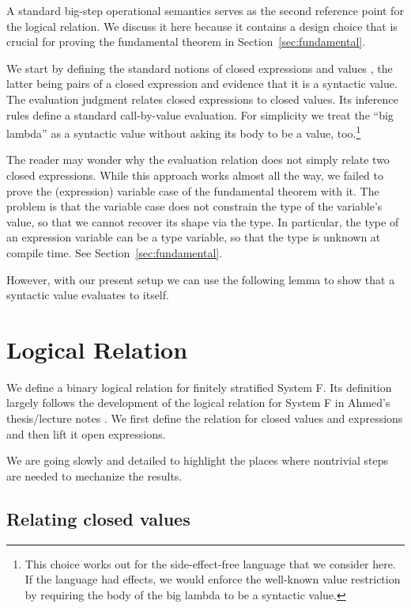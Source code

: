 \documentclass[acmsmall,anonymous,review,screen]{acmart}
\begin{document}
A standard big-step operational semantics serves as the second
reference point for the logical relation. We discuss it here because
it contains a design choice that is crucial for proving the
fundamental theorem in Section~\ref{sec:fundamental}.

We start by defining the
standard notions of closed expressions {\ACExpr} and values {\AValue}, the latter being
pairs of a closed expression and evidence {\AisValue} that it is a syntactic value.
\BigStepCExpr
\BigStepisValue
\BigStepValue
The evaluation judgment relates closed expressions to closed values.
Its inference rules define a standard call-by-value evaluation.
For simplicity we treat the ``big lambda'' as a syntactic value
without asking its body to be a value, too.\footnote{This choice works out for the
  side-effect-free language that we consider here. If the language had
  effects, we would enforce the well-known value restriction by
  requiring the body of the big lambda to be a syntactic value.}
\BigStepSemantics

The reader may wonder why the evaluation relation does not simply relate two closed
expressions. While this approach works almost all the way, we
failed to prove the (expression) variable case of the fundamental theorem with
it. The problem is that the variable case does not constrain the type
of the variable's value, so that we cannot recover its shape via
the {\AisValue} type. In particular, the type of an expression variable can be
a type variable, so that the type is unknown at compile time. See Section~\ref{sec:fundamental}.

However, with our present setup we can use the following lemma to show
that a syntactic value evaluates to itself.
\BigStepValueReduceSelf

\section{Logical Relation}
\label{sec:logical-relation}


We define a binary logical relation for finitely stratified System F.
Its definition largely follows the development of the logical relation
for System F in Ahmed's thesis/lecture notes \cite{AhmedLR}.
We first define the relation for closed values and expressions and
then lift it open expressions.

We are going slowly and detailed to highlight the places where
nontrivial steps are needed to mechanize the results.

\subsection{Relating closed values}
\label{sec:relat-clos-valu}
\end{document}
